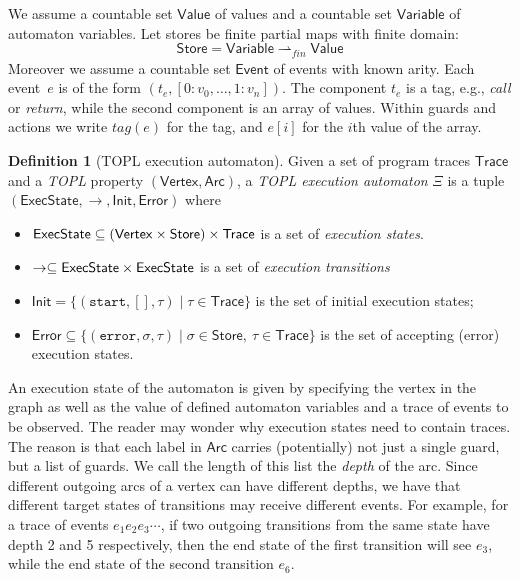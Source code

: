 \documentclass[9pt, preprint]{sigplanconf} %
\newcommand{\pmap}{\rightharpoonup}
\newcommand{\set}[1]{\ensuremath{\mathsf{#1}}}
\theoremstyle{definition}
\newtheorem{definition}{Definition}
\theoremstyle{remark}
\begin{document}
We assume a countable set \set{Value} of values and a countable set $\set{Variable}$ of automaton variables.
Let stores be finite partial maps with finite domain:
\[
\set{Store} = \set{Variable} \pmap_{\mathit{fin}} \set{Value}
\] 
Moreover we assume a countable set \set{Event} of events with known arity.
Each event~$e$ is of the form $(t_e,[0{:} v_0,\dots, 1{:}v_n])$.
The component $t_e$ is a tag, e.g., {\em call} or {\em return}, while the second component is an array of values.
Within guards and actions we write $tag(e)$ for the tag, and $e[i]$ for the $i$th value of the array.
%
\begin{definition}[TOPL execution automaton]
Given a set of program traces $\set{Trace}$ and a {\em TOPL} property $(\set{Vertex},\set{Arc})$, a {\em TOPL execution automaton} $\Xi$ is a tuple
$(\set{ExecState}, \to , \set{Init}, \set{Error})$ where
\begin{itemize}
\item $\set{\World} \subseteq (\set{Vertex}\times \set{Store})\times\set{Trace}$ is a set of {\em execution states}.
\item $\to \subseteq \set{\World} \times \set{\World}$ is a set of {\em execution transitions}
\item $\set{Init}= \{ (\texttt{start}, [], \tau) \mid \tau \in \set{Trace} \}$ is the set of initial execution states;
\item $\set{Error} \subseteq \{ (\texttt{error}, \sigma, \tau) \mid \sigma \in \set{Store},  \ \tau \in \set{Trace} \}$ is the set of accepting (error) execution states.
\end{itemize}
\end{definition}
An execution state of the automaton is given by specifying the vertex in the graph as well as the value of defined automaton variables and a trace of events to be observed.
The reader may wonder why execution states need to contain traces.
The reason is that each label in $\set{Arc}$ carries (potentially) not
just a single guard, but a list of guards. We call the length of this list the \emph{depth} of the arc.
Since different outgoing arcs of a vertex can have different depths, we have that different target states of transitions may receive different events.
For example, for a trace of events $e_1 e_2 e_3\cdots$, if two outgoing transitions from the same state have depth 2 and 5 respectively, then the end state of the first transition will see $e_3$, while the end state of the second transition $e_6$.
\end{document}
